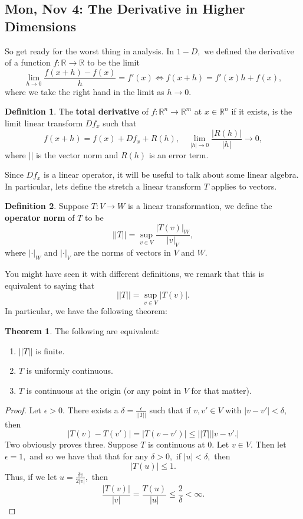 \documentclass[10pt, oneside]{article}
\newcommand{\bbR}{\mathbb{R}}
\theoremstyle{definition}
\newtheorem{thm}{Theorem}
\newtheorem{defn}{Definition}
\begin{document}
\subsection{Mon, Nov 4: The Derivative in Higher Dimensions}
So get ready for the worst thing in analysis.
In $1-D,$ we defined the derivative of a function $f: \bbR \to \bbR$ to be the limit
\[\lim_{h\to 0}\frac{f(x+h) - f(x)}{h} = f'(x)\iff f(x+h) = f'(x)h +f(x),\] where we take the right hand in the limit as $h\to 0.$
\begin{defn}
    The \textbf{total derivative} of $f: \bbR^n \to \bbR^m$ at $x\in \bbR^n$ if it exists, is the limit linear transform $Df_x$ such that
    \[f(x+h) = f(x) + Df_x  + R(h), \quad \lim_{|h|\to 0}\frac{|R(h)|}{|h|}\to 0,\] where $||$ is the vector norm and $R(h)$ is an error term.
\end{defn}
Since $Df_x$ is a linear operator, it will be useful to talk about some linear algebra. In particular, lets define the stretch a linear transform $T$ applies to vectors.
\begin{defn}
    Suppose $T: V \to W$ is a linear transformation, we define the \textbf{operator norm} of $T$ to be 
    \[||T|| = \sup_{v\in V}\frac{|T(v)|_W}{|v|_V},\] where $|\cdot|_W$ and $|\cdot|_V$ are the norms of vectors in $V$ and $W.$
\end{defn}
You might have seen it with different definitions, we remark that this is equivalent to saying that 
\[||T|| = \sup_{v\in V}|T(v)|.\] In particular, we have the following theorem:
\begin{thm}
    The following are equivalent:
    \begin{enumerate}
        \item $||T||$ is finite.
        \item $T$ is uniformly continuous.
        \item $T$ is continuous at the origin (or any point in $V$ for that matter).
    \end{enumerate}
    \end{thm}
\begin{proof}
    Let $\epsilon>0.$ There exists a $\delta = \frac{\epsilon}{||T||}$ such that if $v, v' \in V$ with $|v - v'|< \delta,$ then 
    \[|T(v) - T(v')| = |T(v - v')| \leq ||T|||v-v'.|\] Two obviously proves three. Suppose $T$ is continuous at $0.$ Let $v \in V.$ Then let $\epsilon = 1,$ and so we have that that for any $\delta>0,$ if $|u|< \delta,$ then
    \[|T(u)| \leq 1.\] Thus, if we let $u = \frac{\delta v}{2|v|},$ then 
    \[\frac{|T(v)|}{|v|} = \frac{T(u)}{|u|}\leq \frac{2}{\delta}< \infty.\]
\end{proof}
\end{document}
